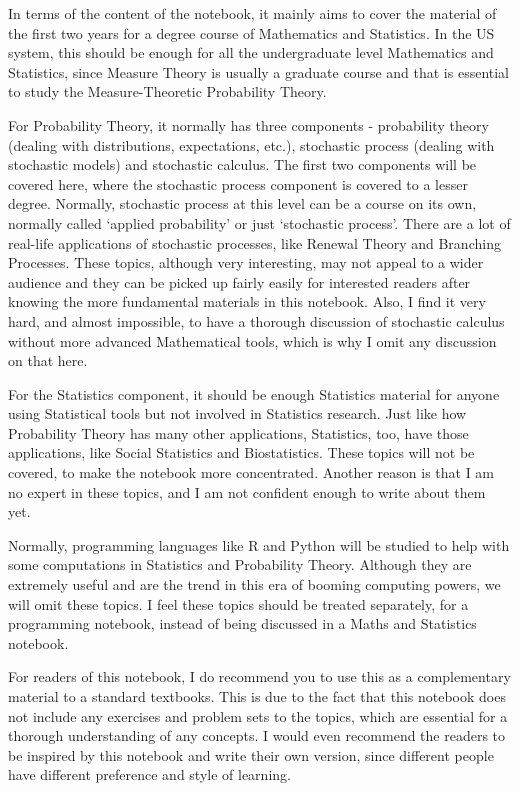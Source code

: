 \documentclass[11pt, a4paper, oneside]{book}
\theoremstyle{definition}
\begin{document}
\noindent In terms of the content of the notebook, it mainly aims to cover the material of the first two years for a degree course of Mathematics and Statistics. In the US system, this should be enough for all the undergraduate level Mathematics and Statistics, since Measure Theory is usually a graduate course and that is essential to study the Measure-Theoretic Probability Theory. 

\noindent For Probability Theory, it normally has three components - probability theory (dealing with distributions, expectations, etc.), stochastic process (dealing with stochastic models) and stochastic calculus. The first two components will be covered here, where the stochastic process component is covered to a lesser degree. Normally, stochastic process at this level can be a course on its own, normally called `applied probability' or just `stochastic process'. There are a lot of real-life applications of stochastic processes, like Renewal Theory and Branching Processes. These topics, although very interesting, may not appeal to a wider audience and they can be picked up fairly easily for interested readers after knowing the more fundamental materials in this notebook. Also, I find it very hard, and almost impossible, to have a thorough discussion of stochastic calculus without more advanced Mathematical tools, which is why I omit any discussion on that here. 

\noindent For the Statistics component, it should be enough Statistics material for anyone using Statistical tools but not involved in Statistics research. Just like how Probability Theory has many other applications, Statistics, too, have those applications, like Social Statistics and Biostatistics. These topics will not be covered, to make the notebook more concentrated. Another reason is that I am no expert in these topics, and I am not confident enough to write about them yet. 

\noindent Normally, programming languages like R and Python will be studied to help with some computations in Statistics and Probability Theory. Although they are extremely useful and are the trend in this era of booming computing powers, we will omit these topics. I feel these topics should be treated separately, for a programming notebook, instead of being discussed in a Maths and Statistics notebook. 

\noindent For readers of this notebook, I do recommend you to use this as a complementary material to a standard textbooks. This is due to the fact that this notebook does not include any exercises and problem sets to the topics, which are essential for a thorough understanding of any concepts. I would even recommend the readers to be inspired by this notebook and write their own version, since different people have different preference and style of learning. 
\end{document}
